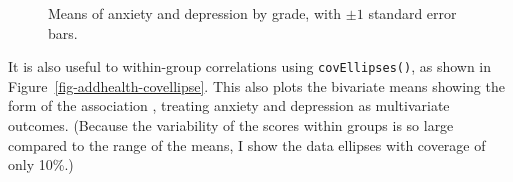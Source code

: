 \documentclass[
  letterpaper,
  10pt,
  krantz2]{krantz}
\makeatletter
\newenvironment{Shaded}{\begin{snugshade}}{\end{snugshade}}
\newcommand{\AttributeTok}[1]{\textcolor[rgb]{0.40,0.45,0.13}{#1}}
\newcommand{\ConstantTok}[1]{\textcolor[rgb]{0.56,0.35,0.01}{#1}}
\newcommand{\DecValTok}[1]{\textcolor[rgb]{0.68,0.00,0.00}{#1}}
\newcommand{\FloatTok}[1]{\textcolor[rgb]{0.68,0.00,0.00}{#1}}
\newcommand{\FunctionTok}[1]{\textcolor[rgb]{0.28,0.35,0.67}{#1}}
\newcommand{\NormalTok}[1]{\textcolor[rgb]{0.00,0.23,0.31}{#1}}
\newcommand{\SpecialCharTok}[1]{\textcolor[rgb]{0.37,0.37,0.37}{#1}}
\newenvironment{kframe}{%
  \medskip{}
  \setlength{\fboxsep}{.8em}
  \def\at@end@of@kframe{}%
  \ifinner\ifhmode%
  \def\at@end@of@kframe{\end{minipage}}%
  \begin{minipage}{\columnwidth}%
  \fi\fi%
  \def\FrameCommand##1{\hskip\@totalleftmargin \hskip-\fboxsep
  \colorbox{shadecolor}{##1}\hskip-\fboxsep
      \hskip-\linewidth \hskip-\@totalleftmargin \hskip\columnwidth}%
  \MakeFramed {\advance\hsize-\width
    \@totalleftmargin\z@ \linewidth\hsize
    \@setminipage}}%
{\par\unskip\endMakeFramed%
  \at@end@of@kframe}
\renewenvironment{Shaded}{\begin{kframe}}{\end{kframe}}
\makeatother
\begin{document}
\begin{figure}[H]


\caption{\label{fig-addhealth-means-each}Means of anxiety and depression
by grade, with \(\pm 1\) standard error bars.}

\end{figure}%

It is also useful to within-group correlations using
\texttt{covEllipses()}, as shown in
Figure~\ref{fig-addhealth-covellipse}. This also plots the bivariate
means showing the form of the association , treating anxiety and
depression as multivariate outcomes. (Because the variability of the
scores within groups is so large compared to the range of the means, I
show the data ellipses with coverage of only 10\%.)

\begin{Shaded}
\end{Shaded}
\end{document}
